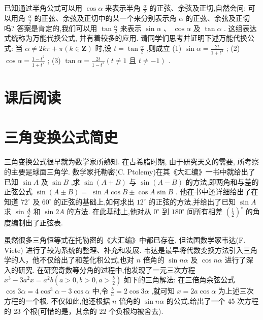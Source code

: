 \documentclass[10pt]{article}
\begin{document}
已知通过半角公式可以用 \(\cos \alpha\) 来表示半角 \(\frac{\alpha }{2}\) 的正弦、余弦及正切,自然会问: 可以用角 \(\frac{\alpha }{2}\) 的正弦、余弦及正切中的某一个来分别表示角 \(\alpha\) 的正弦、余弦及正切吗? 答案是肯定的,我们可以用 \(\tan \frac{\alpha }{2}\) 来表示 \(\sin \alpha \text{ 、 }\cos \alpha\) 及 \(\tan \alpha\) . 这组表达式统称为万能代换公式, 并有着较多的应用. 请同学们思考并证明下述万能代换公式: 当 \(\alpha  \neq  {2k\pi } + \pi \left( {k \in  \mathbf{Z}}\right)\) 时,设 \(t = \tan \frac{\alpha }{2}\) ,则成立 (1) \(\sin \alpha  = \frac{2t}{1 + {t}^{2}}\) ; (2) \(\cos \alpha  = \frac{1 - {t}^{2}}{1 + {t}^{2}}\) ; (3) \(\tan \alpha  = \frac{2t}{1 - {t}^{2}}\left( {t \neq  1\text{ 且 }t \neq   - 1}\right)\) .

\section*{课后阅读}

\section*{三角变换公式简史}

三角变换公式很早就为数学家所熟知. 在古希腊时期, 由于研究天文的需要, 所考察的主要是球面三角学. 数学家托勒密(C. Ptolemy)在其《大汇编》一书中就给出了已知 \(\sin A\) 及 \(\sin B\) ,求 \(\sin \left( {A + B}\right)\) 与 \(\sin \left( {A - B}\right)\) 的方法,即两角和与差的正弦公式 \(\sin \left( {A \pm  B}\right)  = \; \sin A\cos B \pm  \cos A\sin B\) . 他在书中还详细给出了在知道 \({72}^{ \circ  }\) 及 \({60}^{ \circ  }\) 的正弦的基础上,如何求出 \({12}^{ \circ  }\) 的正弦的方法,并给出了已知 \(\sin A\) 求 \(\sin \frac{A}{2}\) 和 \(\sin {2A}\) 的方法. 在此基础上,他对从 \({0}^{ \circ  }\) 到 \({180}^{ \circ  }\) 间所有相差 \({\left( \frac{1}{2}\right) }^{ \circ  }\) 的角度编制出了正弦表.

虽然很多三角恒等式在托勒密的《大汇编》中都已存在, 但法国数学家韦达(F. Viete) 进行了较为系统的整理、补充和发展. 韦达是最早将代数变换方法引入三角学的人，他不仅给出了和差化积公式,也对 \(n\) 倍角的 \(\sin {n\alpha }\) 及 \(\cos {n\alpha }\) 进行了深入的研究. 在研究奇数等分角的过程中,他发现了一元三次方程 \({x}^{3} - 3{a}^{2}x = {a}^{2}b\left( {a > 0,b > 0,a > \frac{b}{2}}\right)\) 如下的三角解法: 在三倍角余弦公式 \(\cos {3\alpha } = 4{\cos }^{3}\alpha  - 3\cos \alpha\) 中,令 \(\frac{b}{a} = 2\cos {3\alpha }\) ,就可知 \(x = {2a}\cos \alpha\) 为上述三次方程的一个根. 不仅如此,他还根据 \(n\) 倍角的 \(\sin {n\alpha }\) 的公式,给出了一个 45 次方程的 23 个根(可惜的是，其余的 22 个负根均被舍去).
\end{document}
